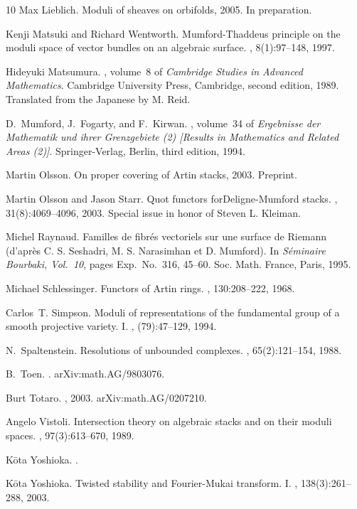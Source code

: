 \documentclass[11pt]{amsart}
\renewcommand{\[}{[\!\hspace{0.03em}[}
\renewcommand{\]}{]\!\hspace{0.03em}]}
\renewcommand{\(}{(\!\hspace{0.03em}(}
\renewcommand{\)}{)\!\hspace{0.03em})}
\theoremstyle{definition}
\theoremstyle{remark}
\begin{document}
\begin{thebibliography}{10}
Max Lieblich.
\newblock Moduli of sheaves on orbifolds, 2005.
\newblock In preparation.

Kenji Matsuki and Richard Wentworth.
\newblock Mumford-{T}haddeus principle on the moduli space of vector bundles on
  an algebraic surface.
, 8(1):97--148, 1997.

Hideyuki Matsumura.
, volume~8 of {\em Cambridge Studies in
  Advanced Mathematics}.
\newblock Cambridge University Press, Cambridge, second edition, 1989.
\newblock Translated from the Japanese by M. Reid.

D.~Mumford, J.~Fogarty, and F.~Kirwan.
, volume~34 of {\em Ergebnisse der
  Mathematik und ihrer Grenzgebiete (2) [Results in Mathematics and Related
  Areas (2)]}.
\newblock Springer-Verlag, Berlin, third edition, 1994.

Martin Olsson.
\newblock On proper covering of {A}rtin stacks, 2003.
\newblock Preprint.

Martin Olsson and Jason Starr.
\newblock Quot functors for{D}eligne-{M}umford stacks.
, 31(8):4069--4096, 2003.
\newblock Special issue in honor of Steven L. Kleiman.

Michel Raynaud.
\newblock Familles de fibr\'es vectoriels sur une surface de {R}iemann
  (d'apr\`es {C}. {S}. {S}eshadri, {M}. {S}. {N}arasimhan et {D}. {M}umford).
\newblock In {\em S\'eminaire Bourbaki, Vol.\ 10}, pages Exp.\ No.\ 316,
  45--60. Soc. Math. France, Paris, 1995.

Michael Schlessinger.
\newblock Functors of {A}rtin rings.
, 130:208--222, 1968.

Carlos~T. Simpson.
\newblock Moduli of representations of the fundamental group of a smooth
  projective variety. {I}.
, (79):47--129, 1994.

N.~Spaltenstein.
\newblock Resolutions of unbounded complexes.
, 65(2):121--154, 1988.

B.~Toen.
.
\newblock arXiv:math.AG/9803076.

Burt Totaro.
, 2003.
\newblock arXiv:math.AG/0207210.

Angelo Vistoli.
\newblock Intersection theory on algebraic stacks and on their moduli spaces.
, 97(3):613--670, 1989.

K{\=o}ta Yoshioka.
.

K{\=o}ta Yoshioka.
\newblock Twisted stability and {F}ourier-{M}ukai transform. {I}.
, 138(3):261--288, 2003.

\end{thebibliography}
\end{document}
